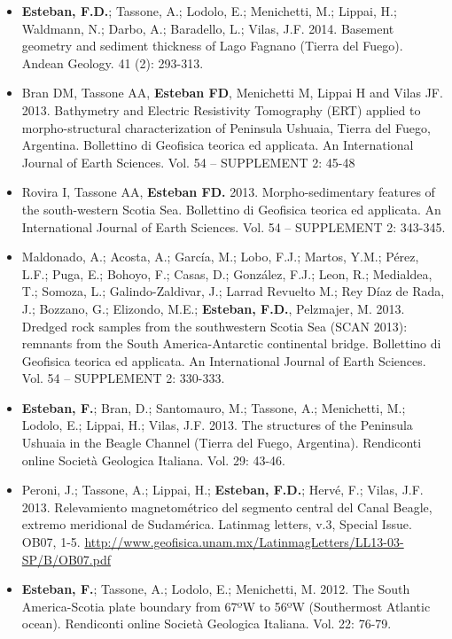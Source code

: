 \documentclass[11pt, a4paper]{article}
\begin{document}
\begin{itemize}
  \item \textbf{Esteban, F.D.}; Tassone, A.; Lodolo, E.; Menichetti, M.; Lippai, H.; Waldmann, N.; Darbo, A.; Baradello, L.; Vilas, J.F. 2014. Basement geometry and sediment thickness of Lago Fagnano (Tierra del Fuego). Andean Geology. 41 (2): 293-313.

  \item Bran DM, Tassone AA, \textbf{Esteban FD}, Menichetti M, Lippai H and Vilas JF. 2013. Bathymetry and Electric Resistivity Tomography (ERT) applied to morpho-structural characterization of Peninsula Ushuaia, Tierra del Fuego, Argentina. Bollettino di Geofisica teorica ed applicata. An International Journal of Earth Sciences. Vol. 54 – SUPPLEMENT 2: 45-48

  \item Rovira I, Tassone AA, \textbf{Esteban FD.} 2013. Morpho-sedimentary features of the south-western Scotia Sea. Bollettino di Geofisica teorica ed applicata. An International Journal of Earth Sciences. Vol. 54 – SUPPLEMENT 2: 343-345.

  \item Maldonado, A.; Acosta, A.; García, M.; Lobo, F.J.; Martos, Y.M.; Pérez, L.F.; Puga, E.; Bohoyo, F.; Casas, D.; González, F.J.; Leon, R.; Medialdea, T.; Somoza, L.; Galindo-Zaldivar, J.; Larrad Revuelto M.; Rey Díaz de Rada, J.; Bozzano, G.; Elizondo, M.E.; \textbf{Esteban, F.D.}, Pelzmajer, M. 2013. Dredged rock samples from the southwestern Scotia Sea (SCAN 2013): remnants from the South America-Antarctic continental bridge. Bollettino di Geofisica teorica ed applicata. An International Journal of Earth Sciences. Vol. 54 – SUPPLEMENT 2: 330-333.

  \item \textbf{Esteban, F.}; Bran, D.; Santomauro, M.; Tassone, A.; Menichetti, M.; Lodolo, E.; Lippai, H.; Vilas, J.F. 2013. The structures of the Peninsula Ushuaia in the Beagle Channel (Tierra del Fuego, Argentina). Rendiconti online Società Geologica Italiana. Vol. 29: 43-46.

  \item Peroni, J.; Tassone, A.; Lippai, H.; \textbf{Esteban, F.D.}; Hervé, F.; Vilas, J.F. 2013. Relevamiento magnetométrico del segmento central del Canal Beagle, extremo meridional de Sudamérica. Latinmag letters, v.3, Special Issue. OB07, 1-5. \url{http://www.geofisica.unam.mx/LatinmagLetters/LL13-03-SP/B/OB07.pdf}

  \item \textbf{Esteban, F.}; Tassone, A.; Lodolo, E.; Menichetti, M. 2012. The South America-Scotia plate boundary from 67ºW to 56ºW (Southermost Atlantic ocean). Rendiconti online Società Geologica Italiana. Vol. 22: 76-79.


\end{itemize}
\end{document}
